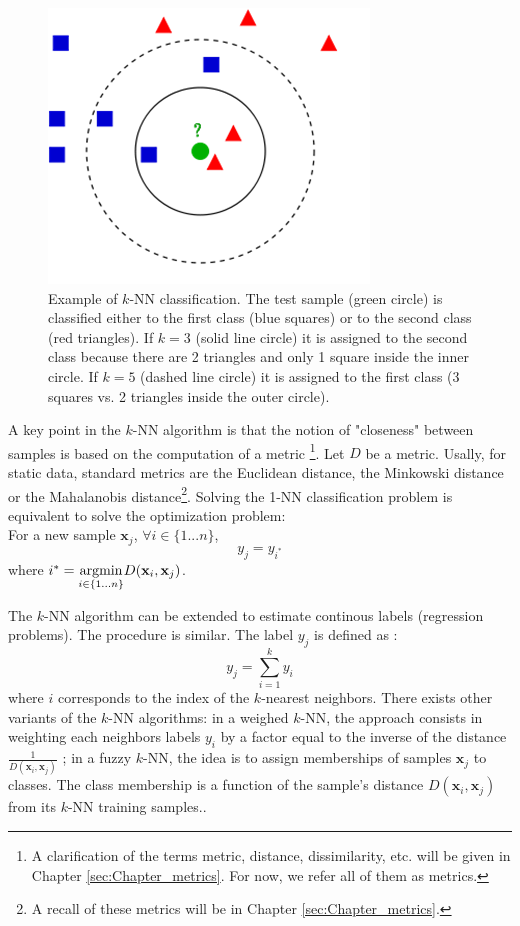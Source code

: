 \begin{figure}
\centering
\includegraphics[width=0.4\linewidth]{images/kNN_example}
\caption{Example of $k$-NN classification. The test sample (green circle) is classified either to the first class (blue squares) or to the second class (red triangles). If $k = 3$ (solid line circle) it is assigned to the second class because there are 2 triangles and only 1 square inside the inner circle. If $k = 5$ (dashed line circle) it is assigned to the first class (3 squares vs. 2 triangles inside the outer circle).}
\label{fig:kNN_example}
\end{figure}

\noindent A key point in the $k$-NN algorithm is that the notion of "closeness" between samples is based on the computation of a metric \footnote{A clarification of the terms metric, distance, dissimilarity, etc. will be given in Chapter \ref{sec:Chapter_metrics}. For now, we refer all of them as metrics.}. Let $D$ be a metric. Usally, for static data, standard metrics are the Euclidean distance, the Minkowski distance or the Mahalanobis distance\footnote{A recall of these metrics will be in Chapter \ref{sec:Chapter_metrics}.}. Solving the 1-NN classification problem is equivalent to solve the optimization problem: \\
\noindent For a new sample $\textbf{x}_j$, $\forall i \in \{1...n\}$,
\begin{equation}
y_j = y_{i^*}
\end{equation}
where $i^*={\underset{i \in \{1...n\}}{\argmin}   D(\textbf{x}_i,\textbf{x}_j)}$.

The $k$-NN algorithm can be extended to estimate continous labels (regression problems). The procedure is similar. The label $y_j$ is defined as :
\begin{equation}
y_j = \sum_{i=1}^{k} y_{i}
\end{equation}
where $i$ corresponds to the index of the $k$-nearest neighbors. There exists other variants of the $k$-NN algorithms: in a weighed $k$-NN, the approach consists in weighting each neighbors labels $y_{i}$ by a factor equal to the inverse of the distance $\frac{1}{D(\textbf{x}_i, \textbf{x}_j)}$ ; in a fuzzy $k$-NN, the idea is to assign memberships of samples $\textbf{x}_j$ to classes. The class membership is a function of the sample’s distance $D(\textbf{x}_i, \textbf{x}_j)$ from its $k$-NN training samples..

